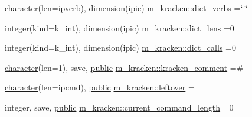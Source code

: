 \begin{DoxyCompactItemize}
\item 
\hyperlink{option__stopwatch_83_8txt_abd4b21fbbd175834027b5224bfe97e66}{character}(len=ipverb), dimension(ipic) \hyperlink{namespacem__kracken_a17809a6c9691598a268881418a993dfc}{m\+\_\+kracken\+::dict\+\_\+verbs} =\char`\"{} \char`\"{}
\item 
integer(kind=k\+\_\+int), dimension(ipic) \hyperlink{namespacem__kracken_a8c7408a65bf208a0d706023a254db206}{m\+\_\+kracken\+::dict\+\_\+lens} =0
\item 
integer(kind=k\+\_\+int), dimension(ipic) \hyperlink{namespacem__kracken_a02bb6de9fee41e706f457133a906675e}{m\+\_\+kracken\+::dict\+\_\+calls} =0
\item 
\hyperlink{option__stopwatch_83_8txt_abd4b21fbbd175834027b5224bfe97e66}{character}(len=1), save, \hyperlink{M__stopwatch_83_8txt_a2f74811300c361e53b430611a7d1769f}{public} \hyperlink{namespacem__kracken_ac26b840ca27114f5efb8fcbf48e184b4}{m\+\_\+kracken\+::kracken\+\_\+comment} =\textquotesingle{}\#\textquotesingle{}
\item 
\hyperlink{option__stopwatch_83_8txt_abd4b21fbbd175834027b5224bfe97e66}{character}(len=ipcmd), \hyperlink{M__stopwatch_83_8txt_a2f74811300c361e53b430611a7d1769f}{public} \hyperlink{namespacem__kracken_a012a1a99d749bbdcc4b9af483d09fec1}{m\+\_\+kracken\+::leftover} =\textquotesingle{} \textquotesingle{}
\item 
integer, save, \hyperlink{M__stopwatch_83_8txt_a2f74811300c361e53b430611a7d1769f}{public} \hyperlink{namespacem__kracken_ab43d490209ce4f08f9a2c563b1a80d9a}{m\+\_\+kracken\+::current\+\_\+command\+\_\+length} =0
\end{DoxyCompactItemize}

